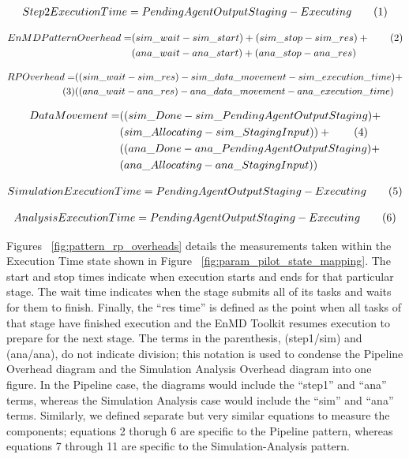 \documentclass[]{article}
\newcommand\numberthis{\addtocounter{equation}{1}\tag{\theequation}}
\begin{document}
			\begin{align*}
				Step 2 Execution Time = PendingAgentOutputStaging - Executing \numberthis \label{6}
			\end{align*}

			\begin{align*}
				EnMD Pattern Overhead = &(sim\_wait-sim\_start) + (sim\_stop - sim\_res) + \numberthis \label{7} \\
										&(ana\_wait-ana\_start) + (ana\_stop - ana\_res) 
			\end{align*}

			\begin{align*}
				RP Overhead = &((sim\_wait - sim\_res) - sim\_data\_movement - sim\_execution\_time) + \\ \numberthis \label{8} 
							  &((ana\_wait - ana\_res) - ana\_data\_movement - ana\_execution\_time) 
			\end{align*}

			\begin{align*}
				Data Movement = &((sim\_Done - sim\_PendingAgentOutputStaging) + \\
								&(sim\_Allocating - sim\_StagingInput)) + \numberthis \label{9} \\
								&((ana\_Done - ana\_PendingAgentOutputStaging) + \\
								&(ana\_Allocating - ana\_StagingInput)) 
			\end{align*}
			
			\begin{align*}
				Simulation Execution Time = PendingAgentOutputStaging - Executing \numberthis \label{10}
			\end{align*}

			\begin{align*}
				Analysis Execution Time = PendingAgentOutputStaging - Executing \numberthis \label{11}
			\end{align*}



			Figures ~\ref{fig:pattern_rp_overheads} details the measurements taken within the Execution Time state shown in Figure ~\ref{fig:param_pilot_state_mapping}. The start and stop times indicate when execution starts and ends for that particular stage. The wait time indicates when the stage submits all of its tasks and waits for them to finish. Finally, the ``res time'' is defined as the point when all tasks of that stage have finished execution and the EnMD Toolkit resumes execution to prepare for the next stage. The terms in the parenthesis, (step1/sim) and (ana/ana), do not indicate division; this notation is used to condense the Pipeline Overhead diagram and the Simulation Analysis Overhead diagram into one figure. In the Pipeline case, the diagrams would include the ``step1'' and ``ana'' terms, whereas the Simulation Analysis case would include the ``sim'' and ``ana'' terms. Similarly, we defined separate but very similar equations to measure the components; equations 2 thorugh 6 are specific to the Pipeline pattern, whereas equations 7 through 11 are specific to the Simulation-Analysis pattern.
\end{document}
